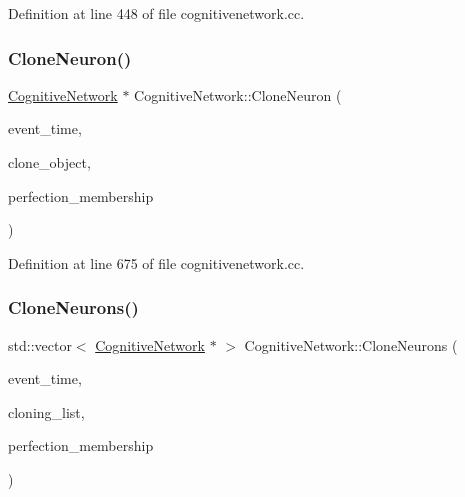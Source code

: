 Definition at line 448 of file cognitivenetwork.\+cc.

\mbox{\label{class_cognitive_network_abf42d64965d64836d6fcbd7ce33c8db4}} 
\subsubsection{\texorpdfstring{Clone\+Neuron()}{CloneNeuron()}}
{\footnotesize\ttfamily \mbox{\hyperlink{class_cognitive_network}{Cognitive\+Network}} $\ast$ Cognitive\+Network\+::\+Clone\+Neuron (\begin{DoxyParamCaption}\item[{std\+::chrono\+::time\+\_\+point$<$ \mbox{\hyperlink{universe_8h_a0ef8d951d1ca5ab3cfaf7ab4c7a6fd80}{Clock}} $>$}]{event\+\_\+time,  }\item[{\mbox{\hyperlink{class_cognitive_network}{Cognitive\+Network}} $\ast$}]{clone\+\_\+object,  }\item[{double}]{perfection\+\_\+membership }\end{DoxyParamCaption})}



Definition at line 675 of file cognitivenetwork.\+cc.

\mbox{\label{class_cognitive_network_a8852409e92434523ddbd48d699c5609f}} 
\subsubsection{\texorpdfstring{Clone\+Neurons()}{CloneNeurons()}}
{\footnotesize\ttfamily std\+::vector$<$ \mbox{\hyperlink{class_cognitive_network}{Cognitive\+Network}} $\ast$ $>$ Cognitive\+Network\+::\+Clone\+Neurons (\begin{DoxyParamCaption}\item[{std\+::chrono\+::time\+\_\+point$<$ \mbox{\hyperlink{universe_8h_a0ef8d951d1ca5ab3cfaf7ab4c7a6fd80}{Clock}} $>$}]{event\+\_\+time,  }\item[{std\+::vector$<$ \mbox{\hyperlink{class_cognitive_network}{Cognitive\+Network}} $\ast$$>$}]{cloning\+\_\+list,  }\item[{double}]{perfection\+\_\+membership }\end{DoxyParamCaption})}



